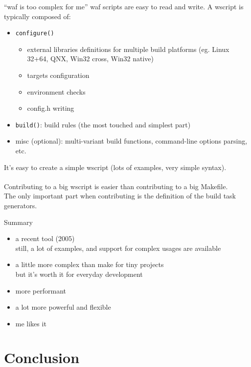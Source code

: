 \documentclass[xetex]{beamer}
\begin{document}
\begin{frame}{“waf is too complex for me”}
	waf scripts are easy to read and write.
	A wscript is typically composed of:
	\begin{itemize}
		\item \texttt{configure()}
		\begin{itemize}
			\scriptsize
			\item external libraries definitions for multiple build platforms (eg. Linux 32+64, QNX, Win32 cross, Win32 native)
			\item targets configuration
			\item environment checks
			\item config.h writing
		\end{itemize}
		\item \texttt{build()}: build rules (the most touched and simplest part)
		\item misc (optional): multi-variant build functions, command-line options parsing, etc.
	\end{itemize}
	
	It's easy to create a simple wscript (lots of examples, very simple syntax).
	\\
	~\\
	Contributing to a big wscript is easier than contributing to a big Makefile.
	\\
	The only important part when contributing is the definition of the build task generators.
\end{frame}


\begin{frame}{Summary}
	\begin{itemize}
		\item a recent tool (2005)\\
		still, a lot of examples, and support for complex usages are available
		\item a little more complex than make for tiny projects\\
		but it's worth it for everyday development
		\item more performant
		\item a lot more powerful and flexible
		\item me likes it
	\end{itemize}
\end{frame}

\section{Conclusion}
\end{document}
